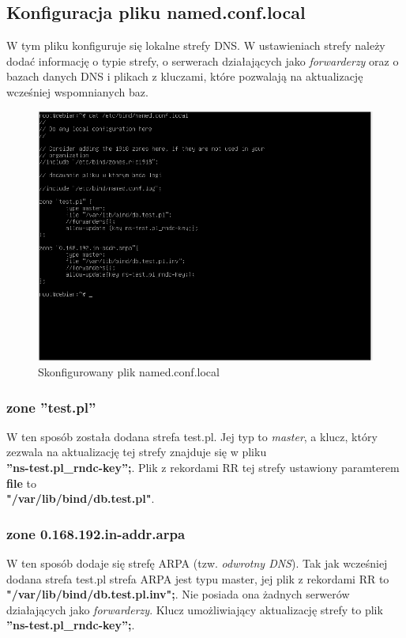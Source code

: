 \documentclass[12pt, a4paper]{article}
\begin{document}
    \subsection{Konfiguracja pliku named.conf.local}
        W tym pliku konfiguruje się lokalne strefy DNS. W ustawieniach strefy należy dodać informację o typie strefy, o serwerach działających jako \textit{forwarderzy} oraz o bazach danych DNS i plikach z kluczami, które pozwalają na aktualizację wcześniej wspomnianych baz.
        \begin{figure}[!h]
            \centering
            \includegraphics[width=\textwidth]{named_conf_local.PNG}
            \caption{Skonfigurowany plik named.conf.local}
            \label{fig:named_conf_local}
        \end{figure}
        
        \subsubsection{zone ''test.pl''}
            W ten sposób została dodana strefa test.pl. Jej typ to \textit{master}, a klucz, który zezwala na aktualizację tej strefy znajduje się w pliku \\ \textbf{''ns-test.pl\_rndc-key'';}. Plik z rekordami RR tej strefy ustawiony paramterem \textbf{file} to \\ \textbf{"/var/lib/bind/db.test.pl"}.
            
        \subsubsection{zone 0.168.192.in-addr.arpa}
            W ten sposób dodaje się strefę ARPA (tzw. \textit{odwrotny DNS}). Tak jak wcześniej dodana strefa test.pl strefa ARPA jest typu master, jej plik z rekordami RR to \textbf{"/var/lib/bind/db.test.pl.inv";}. Nie posiada ona żadnych serwerów działających jako \textit{forwarderzy}. Klucz umożliwiający aktualizację strefy to plik \textbf{''ns-test.pl\_rndc-key'';}.
\end{document}
